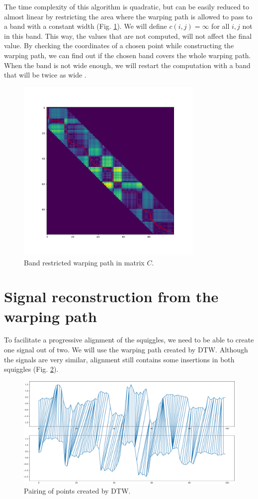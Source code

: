 The time complexity of this algorithm is quadratic, but can be easily reduced to almost linear by restricting the area where the warping path is allowed to pass to a band with a constant width (Fig. \ref{fig:belt}). We will define $c(i,j)=\infty$ for all $i,j$ not in this band. This way, the values that are not computed, will not affect the final value. By checking the coordinates of a chosen point while constructing the warping path, we can find out if the chosen band covers the whole warping path. 
When the band is not wide enough, we will restart the computation with a band that will be twice as wide \cite{band}.
\begin{figure}[h]
  \centering
  \includegraphics[width=0.8\textwidth]{images/wp2}
  \caption{Band restricted warping path in matrix $C$.}
  \label{fig:belt}
\end{figure}


\section{Signal reconstruction from the warping path}

To facilitate a progressive alignment of the squiggles, we need to be able to create one signal out of two. We will use the warping path created by DTW.
Although the signals are very similar, alignment still contains some insertions in both squiggles (Fig. \ref{fig:pairing}). 

\begin{figure}
  \centering
  \includegraphics[width=1.0\textwidth]{images/ciary}
  \caption{Pairing of points created by DTW.}
  \label{fig:pairing}
\end{figure}

